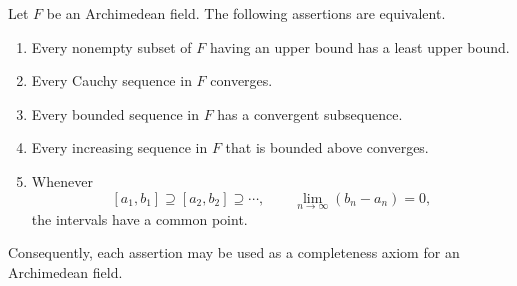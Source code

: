 \begin{theorem}
\label{thm:completeness-equivalences}
Let $F$ be an Archimedean field. The following assertions are equivalent.
\begin{enumerate}
\item Every nonempty subset of $F$ having an upper bound has a least upper bound.
\item Every Cauchy sequence in $F$ converges.
\item Every bounded sequence in $F$ has a convergent subsequence.
\item Every increasing sequence in $F$ that is bounded above converges.
\item Whenever
\[
[a_1,b_1]\supseteq[a_2,b_2]\supseteq\cdots,\qquad \lim_{n\to\infty}(b_n-a_n)=0,
\]
the intervals have a common point.
\end{enumerate}
Consequently, each assertion may be used as a completeness axiom for an Archimedean field.
\end{theorem}

